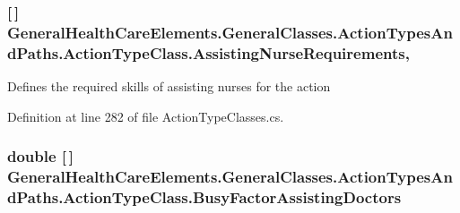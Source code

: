 \subsubsection[{\texorpdfstring{Assisting\+Nurse\+Requirements}{AssistingNurseRequirements}}]{ \mbox{[}$\,$\mbox{]} General\+Health\+Care\+Elements.\+General\+Classes.\+Action\+Types\+And\+Paths.\+Action\+Type\+Class.\+Assisting\+Nurse\+Requirements\hspace{0.3cm}{\ttfamily [get]}, {\ttfamily [set]}}\hypertarget{class_general_health_care_elements_1_1_general_classes_1_1_action_types_and_paths_1_1_action_type_class_af266857287fd31e4179432fff59ecbcc}{}\label{class_general_health_care_elements_1_1_general_classes_1_1_action_types_and_paths_1_1_action_type_class_af266857287fd31e4179432fff59ecbcc}


Defines the required skills of assisting nurses for the action 



Definition at line 282 of file Action\+Type\+Classes.\+cs.

\subsubsection[{\texorpdfstring{Busy\+Factor\+Assisting\+Doctors}{BusyFactorAssistingDoctors}}]{\setlength{\rightskip}{0pt plus 5cm}double \mbox{[}$\,$\mbox{]} General\+Health\+Care\+Elements.\+General\+Classes.\+Action\+Types\+And\+Paths.\+Action\+Type\+Class.\+Busy\+Factor\+Assisting\+Doctors\hspace{0.3cm}{\ttfamily [get]}}\hypertarget{class_general_health_care_elements_1_1_general_classes_1_1_action_types_and_paths_1_1_action_type_class_a507c6b866ff0b039213e81519e600181}{}\label{class_general_health_care_elements_1_1_general_classes_1_1_action_types_and_paths_1_1_action_type_class_a507c6b866ff0b039213e81519e600181}



